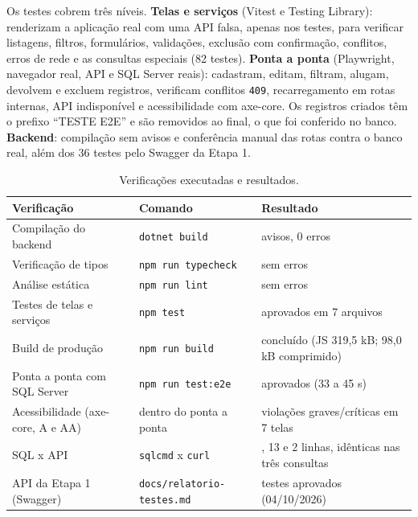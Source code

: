 \documentclass[12pt]{article}
\begin{document}
Os testes cobrem três níveis. \textbf{Telas e serviços} (Vitest e Testing Library): renderizam a aplicação real com uma API falsa, apenas nos testes, para verificar listagens, filtros, formulários, validações, exclusão com confirmação, conflitos, erros de rede e as consultas especiais (82 testes). \textbf{Ponta a ponta} (Playwright, navegador real, API e SQL Server reais): cadastram, editam, filtram, alugam, devolvem e excluem registros, verificam conflitos \texttt{409}, recarregamento em rotas internas, API indisponível e acessibilidade com axe-core. Os registros criados têm o prefixo “TESTE E2E” e são removidos ao final, o que foi conferido no banco. \textbf{Backend}: compilação sem avisos e conferência manual das rotas contra o banco real, além dos 36 testes pelo Swagger da Etapa 1.

\begin{table}[H]
  \centering
  \caption{Verificações executadas e resultados.}
  \label{tab:testes}
  \small
  \begin{tabular}{|>{\raggedright\arraybackslash}p{4.54cm}|>{\raggedright\arraybackslash}p{4.02cm}|>{\raggedright\arraybackslash}p{4.89cm}|}
  \hline
  \textbf{Verificação} & \textbf{Comando} & \textbf{Resultado} \\ \hline
  Compilação do backend & \texttt{dotnet build} & 0 avisos, 0 erros \\ \hline
  Verificação de tipos & \texttt{npm run typecheck} & sem erros \\ \hline
  Análise estática & \texttt{npm run lint} & sem erros \\ \hline
  Testes de telas e serviços & \texttt{npm test} & 82 aprovados em 7 arquivos \\ \hline
  Build de produção & \texttt{npm run build} & concluído (JS 319,5 kB; 98,0 kB comprimido) \\ \hline
  Ponta a ponta com SQL Server & \texttt{npm run test:e2e} & 8 aprovados (33 a 45 s) \\ \hline
  Acessibilidade (axe-core, A e AA) & dentro do ponta a ponta & 0 violações graves/críticas em 7 telas \\ \hline
  SQL x API & \texttt{sqlcmd} x \texttt{curl} & 10, 13 e 2 linhas, idênticas nas três consultas \\ \hline
  API da Etapa 1 (Swagger) & \texttt{docs/\allowbreak{}relatorio-testes.\allowbreak{}md} & 36 testes aprovados (04/10/2026) \\ \hline
  \end{tabular}
\end{table}
\end{document}
